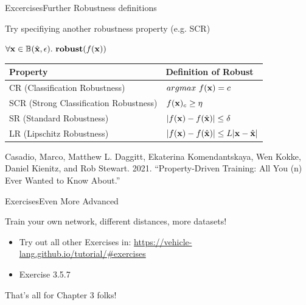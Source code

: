 \documentclass[t,compress,aspectratio=169]{beamer}
\begin{document}
\begin{frame}{Excercises}{Further Robustness definitions}
\vspace{-2em}

\begin{block}{Try specifiying another robustness property (e.g. SCR)}
\end{block}
\vspace{-1em}
$\forall \mathbf{x} \in \mathbb{B}(\hat{\mathbf{x}}, \epsilon). \ \textbf{robust}(f(\mathbf{x}))$

\begin{center}

\begin{tabular}{l|l} 
		\toprule
		 \textbf{Property} & \textbf{Definition of Robust}  \\
		\midrule \midrule
		   CR (Classification Robustness) & $argmax\ f(\mathbf{x}) = c$ \\
		\midrule
		 SCR (Strong Classification Robustness) & $f(\mathbf{x})_c \geq \eta$  \\
		\midrule
		 SR (Standard Robustness) &	$|f(\mathbf{x}) - f(\hat{\mathbf{x}})| \leq \delta$ \\ 
		\midrule
         LR (Lipschitz Robustness) & $|f(\mathbf{x}) - f(\hat{\mathbf{x}})| \leq L|\mathbf{x}-\hat{\mathbf{x}}|$  \\ 
		\bottomrule
\end{tabular}
\end{center}
\footnotesize{Casadio, Marco, Matthew L. Daggitt, Ekaterina Komendantskaya, Wen Kokke, Daniel Kienitz, and Rob Stewart. 2021. “Property-Driven Training: All You (n) Ever Wanted to Know About.” }

\end{frame}




\begin{frame}{Exercises}{Even More Advanced}

\begin{block}{Train your own network, different distances, more datasets!}

\begin{itemize}
\item Try  out all other Exercises in: 
\url{https://vehicle-lang.github.io/tutorial/\#exercises}
\item \textcolor{aisecred}{Exercise 3.5.7}
\end{itemize}
\end{block}
\vspace{2em}
\begin{center}
    \huge{\textcolor{aisecred}{That's all for Chapter 3 folks!}}
\end{center}

\end{frame}
\end{document}
